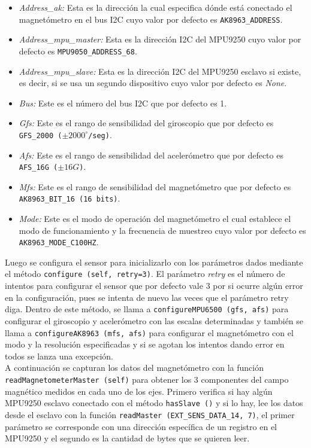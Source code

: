 \begin{itemize}
 \item \textit{Address\_ak:} Esta es la dirección la cual especifica dónde está conectado el magnetómetro en el bus I2C cuyo valor por defecto es \texttt{AK8963\_ADDRESS}.
 \item \textit{Address\_mpu\_master:} Esta es la dirección I2C del MPU9250 cuyo valor por defecto es \texttt{MPU9050\_ADDRESS\_68}.
 \item \textit{Address\_mpu\_slave:} Esta es la dirección I2C del MPU9250 esclavo si existe, es decir, si se usa un segundo dispositivo cuyo valor por defecto es \textit{None}.
 \item \textit{Bus:} Este es el número del bus I2C que por defecto es 1.
 \item \textit{Gfs:} Este es el rango de sensibilidad del giroscopio que por defecto es \texttt{GFS\_2000 ($\pm 2000^\circ$/seg)}.
 \item \textit{Afs:} Este es el rango de sensibilidad del acelerómetro que por defecto es \texttt{AFS\_16G ($\pm 16G$)}.
 \item \textit{Mfs:} Este es el rango de sensibilidad del magnetómetro que por defecto es \texttt{AK8963\_BIT\_16 (16 bits)}.
 \item \textit{Mode:} Este es el modo de operación del magnetómetro el cual establece el modo de funcionamiento y la frecuencia de muestreo cuyo valor por defecto es \texttt{AK8963\_MODE\_C100HZ}.
\end{itemize}


Luego se configura el sensor para inicializarlo con los parámetros dados mediante el método \verb|configure (self, retry=3)|. El parámetro \textit{retry} es el número de intentos para configurar el sensor que por defecto vale 3 por si ocurre algún error en la configuración, pues se intenta de nuevo las veces que el parámetro retry diga. Dentro de este método, se llama a \verb|configureMPU6500 (gfs, afs)| para configurar el giroscopio y acelerómetro con las escalas determinadas y también se llama a \verb|configureAK8963 (mfs, afs)| para configurar el magnetómetro con el modo y la resolución especificadas y si se agotan los intentos dando error en todos se lanza una excepción.\\


A continuación se capturan los datos del magnetómetro con la función \verb|readMagnetometerMaster (self)| para obtener los 3 componentes del campo magnético medidos en cada uno de los ejes. Primero verifica si hay algún MPU9250 esclavo conectado con el método \verb|hasSlave ()| y si lo hay, lee los datos desde el esclavo con la función \verb|readMaster (EXT_SENS_DATA_14, 7)|, el primer parámetro se corresponde con una dirección específica de un registro en el MPU9250 y el segundo es la cantidad de bytes que se quieren leer.\\


